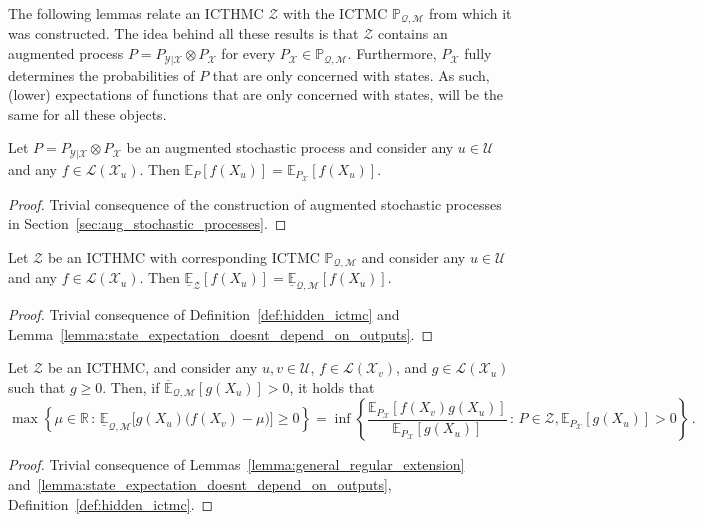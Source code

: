 \documentclass[twoside,11pt]{article}
\newcommand{\reals}{\mathbb{R}}
\newcommand{\states}{\mathcal{X}}
\newcommand{\observs}{\mathcal{Y}}
\newcommand{\lexp}{\underline{\mathbb{E}}_{\rateset,\mathcal{M}}}
\newcommand{\uexp}{\overline{\mathbb{E}}_{\rateset,\mathcal{M}}}
\newcommand{\gambles}{\mathcal{L}}
\newcommand{\rateset}{\mathcal{Q}}
\begin{document}
The following lemmas relate an ICTHMC $\mathcal{Z}$ with the ICTMC $\mathbb{P}_{\rateset,\mathcal{M}}$ from which it was constructed. The idea behind all these results is that $\mathcal{Z}$ contains an augmented process $P=P_{\observs\vert\states}\otimes P_\states$ for every $P_\states\in \mathbb{P}_{\rateset,\mathcal{M}}$. Furthermore, $P_\states$ fully determines the probabilities of $P$ that are only concerned with states. As such, (lower) expectations of functions that are only concerned with states, will be the same for all these objects.

\begin{lemma}\label{lemma:state_expectation_doesnt_depend_on_outputs}
Let $P=P_{\observs\vert\states}\otimes P_\states$ be an augmented stochastic process and consider any $u\in\mathcal{U}$ and any $f\in\gambles(\states_u)$. Then $\mathbb{E}_P[f(X_u)] = \mathbb{E}_{P_\states}[f(X_u)]$.
\end{lemma}
\begin{proof}
Trivial consequence of the construction of augmented stochastic processes in Section~\ref{sec:aug_stochastic_processes}.
\end{proof}

\begin{lemma}\label{lemma:state_lower_expectation_doesnt_depend_on_outputs}
Let $\mathcal{Z}$ be an ICTHMC with corresponding ICTMC $\mathbb{P}_{\rateset,\mathcal{M}}$ and consider any $u\in\mathcal{U}$ and any $f\in\gambles(\states_u)$. Then $\underline{\mathbb{E}}_\mathcal{Z}[f(X_u)]=\lexp[f(X_u)]$.
\end{lemma}
\begin{proof}
Trivial consequence of Definition~\ref{def:hidden_ictmc} and Lemma~\ref{lemma:state_expectation_doesnt_depend_on_outputs}.
\end{proof}

\begin{corollary}\label{cor:lower_hidden_is_root_chain}
Let $\mathcal{Z}$ be an ICTHMC, and consider any $u,v\in\mathcal{U}$, $f\in\gambles(\states_v)$, and $g\in\gambles(\states_u)$ such that $g\geq 0$. Then, if $\uexp[g(X_u)]>0$, it holds that
\begin{equation*}
\max\left\{\mu\in\reals\,:\, \lexp\bigl[g(X_u)\bigl(f(X_v) - \mu\bigr)\bigr] \geq 0\right\} = \inf\left\{ \frac{\mathbb{E}_{P_\states}[f(X_v)g(X_u)]}{\mathbb{E}_{P_\states}[g(X_u)]}\,:\,P\in\mathcal{Z}, \mathbb{E}_{P_\states}[g(X_u)]>0 \right\}\,.
\end{equation*}
\end{corollary}
\begin{proof}
Trivial consequence of Lemmas~\ref{lemma:general_regular_extension} and~\ref{lemma:state_expectation_doesnt_depend_on_outputs}, Definition~\ref{def:hidden_ictmc}.
\end{proof}
\end{document}
